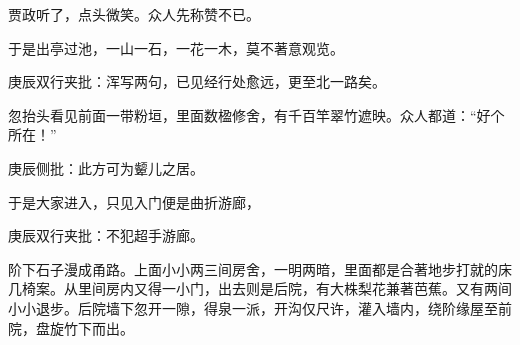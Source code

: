 \begin{parag}

    贾政听了，点头微笑。众人先称赞不已。
\end{parag}


\begin{parag}


    于是出亭过池，一山一石，一花一木，莫不著意观览。\begin{note}庚辰双行夹批：浑写两句，已见经行处愈远，更至北一路矣。\end{note}忽抬头看见前面一带粉垣，里面数楹修舍，有千百竿翠竹遮映。众人都道：“好个所在！”\begin{note}庚辰侧批：此方可为颦儿之居。\end{note}于是大家进入，只见入门便是曲折游廊，\begin{note}庚辰双行夹批：不犯超手游廊。\end{note}阶下石子漫成甬路。上面小小两三间房舍，一明两暗，里面都是合著地步打就的床几椅案。从里间房内又得一小门，出去则是后院，有大株梨花兼著芭蕉。又有两间小小退步。后院墙下忽开一隙，得泉一派，开沟仅尺许，灌入墙内，绕阶缘屋至前院，盘旋竹下而出。
\end{parag}


